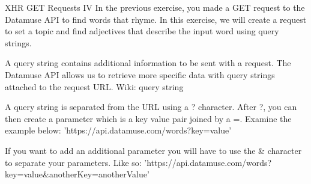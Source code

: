 XHR GET Requests IV
    In the previous exercise, you made a GET request to the Datamuse API to find words that rhyme. In this exercise, we will create a request to set a topic and find adjectives that describe the input word using query strings.
    
    A query string contains additional information to be sent with a request. The Datamuse API allows us to retrieve more specific data with query strings attached to the request URL.
        Wiki: query string

    A query string is separated from the URL using a ? character. After ?, you can then create a parameter which is a key value pair joined by a =. Examine the example below:
        'https://api.datamuse.com/words?key=value'

    If you want to add an additional parameter you will have to use the & character to separate your parameters. Like so:
        'https://api.datamuse.com/words?key=value&anotherKey=anotherValue'